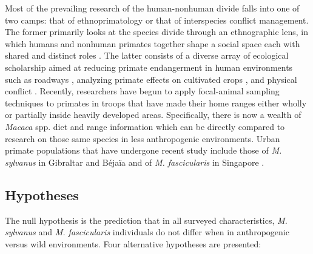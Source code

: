\documentclass{../../../coursework}
\begin{document}
Most of the prevailing research of the human-nonhuman divide falls into one of
two camps: that of ethnoprimatology or that of interspecies conflict
management. The former primarily looks at the species divide through an
ethnographic lens, in which humans and nonhuman primates together shape a
social space each with shared and distinct roles \parencite{Fue12,Ril13}. The
latter consists of a diverse array of ecological scholarship aimed at reducing
primate endangerment in human environments such as roadways \parencite{Lin16},
analyzing primate effects on cultivated crops \parencite{Hil17,Hoc17,McK15},
and physical conflict \parencite{Hof12}. Recently, researchers have begun to
apply focal-animal sampling techniques to primates in troops that have made
their home ranges either wholly or partially inside heavily developed areas.
Specifically, there is now a wealth of
\textit{Macaca} spp. diet and range information
which can be directly compared to research on those same species in less
anthropogenic environments. Urban primate populations that have undergone
recent study include those of \textit{M. sylvanus} in Gibraltar
\parencite{Ethnoprimatology6,Kle17} and Béjaïa \parencite{Mai15} and of
\textit{M. fascicularis} in Singapore \parencite{Kle17}.

\subsection{Hypotheses}

The null hypothesis is the prediction that in all surveyed characteristics,
\textit{M. sylvanus} and \textit{M. fascicularis} individuals do not differ
when in anthropogenic versus wild environments. Four alternative hypotheses
are presented:
\end{document}
